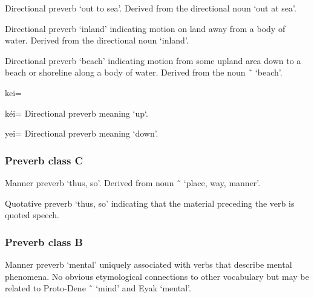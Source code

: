\begin{morphdesc}
\item[\X{daak=}]
	Directional preverb ‘out to sea’.
	Derived from the directional noun  ‘out at sea’.

\item[\X{daaḵ=}]
	Directional preverb ‘inland’ indicating motion on land away from a body of water.
	Derived from the directional noun  ‘inland’.

\item[\X{eeḵ=}]
\item[\X{eèḵ=}] \removeitemvspace
\item[\X{eiḵ=}] \removeitemvspace
\item[\X{ÿeeḵ=}] \removeitemvspace
\item[\X{ÿeiḵ=}] \removeitemvspace
	Directional preverb ‘beach’ indicating motion from some upland area down to a beach
		or shoreline along a body of water.
	Derived from the noun  \~\  ‘beach’.

\item[kei=]
\item[kéi=] \removeitemvspace
	Directional preverb meaning ‘up‘.

\item[yei=]
	Directional preverb meaning ‘down’.
\end{morphdesc}

\subsubsection{Preverb class C}\label{sec:inventory-preverb-C}

\begin{morphdesc}
\item[\X{yéi=}]
	Manner preverb ‘thus, so’.
	Derived from noun  \~\  ‘place, way, manner’.

\item[{\X[yóo=quot]{yóo=}}]
	Quotative preverb ‘thus, so’ indicating that the material preceding the verb is quoted speech.
\end{morphdesc}

\subsubsection{Preverb class B}\label{sec:inventory-preverb-B}

\begin{morphdesc}
\item[{\X[ÿaa=mind]{ÿaa=}}]
	Manner preverb ‘mental’ uniquely associated with verbs that describe mental phenomena.
	No obvious etymological connections to other vocabulary
		but may be related to Proto-Dene  \~\  ‘mind’
		and Eyak  ‘mental’.
\end{morphdesc}

